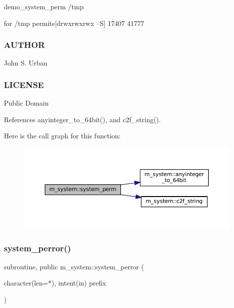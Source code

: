 demo\+\_\+system\+\_\+perm /tmp

for /tmp permits\mbox{[}drwxrwxrwx --S\mbox{]} 17407 41777

\subsubsection*{A\+U\+T\+H\+OR}

John S. Urban

\subsubsection*{L\+I\+C\+E\+N\+SE}

Public Domain 

References anyinteger\+\_\+to\+\_\+64bit(), and c2f\+\_\+string().

Here is the call graph for this function\+:\nopagebreak
\begin{figure}[H]
\begin{center}
\leavevmode
\includegraphics[width=350pt]{namespacem__system_ae8f39e1d4e420396319105e4e81f92b5_cgraph}
\end{center}
\end{figure}
\mbox{\label{namespacem__system_afae451a1fc5432274dc1f75a364051b4}} 
\subsubsection{\texorpdfstring{system\+\_\+perror()}{system\_perror()}}
{\footnotesize\ttfamily subroutine, public m\+\_\+system\+::system\+\_\+perror (\begin{DoxyParamCaption}\item[{character(len=$\ast$), intent(in)}]{prefix }\end{DoxyParamCaption})}



